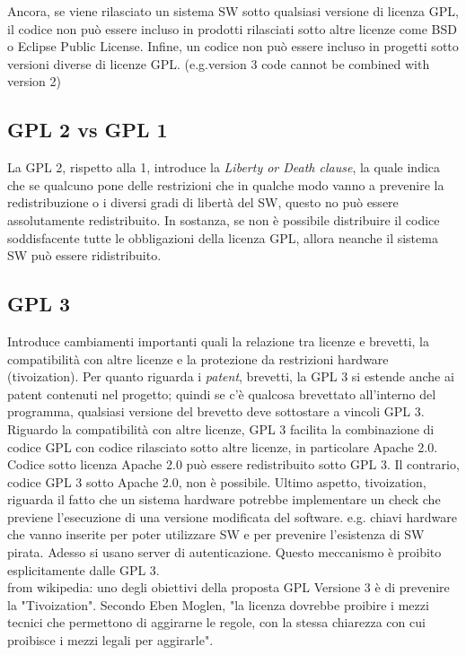\documentclass[10pt,a4paper]{book}
\begin{document}
Ancora, se viene rilasciato un sistema SW sotto qualsiasi versione di licenza GPL, il codice non può essere incluso in prodotti rilasciati sotto altre licenze come BSD o Eclipse Public License.
Infine, un codice non può essere incluso in progetti sotto versioni diverse di licenze GPL. (e.g.version 3 code cannot be combined with version 2)

\subsection{GPL 2 vs GPL 1}
La GPL 2, rispetto alla 1, introduce la \textit{Liberty or Death clause}, la quale indica che se qualcuno pone delle restrizioni che in qualche modo vanno a prevenire la redistribuzione o i diversi gradi di libertà del SW, questo no può essere assolutamente redistribuito.
In sostanza, se non è possibile distribuire il codice soddisfacente tutte le obbligazioni della licenza GPL, allora neanche il sistema SW può essere ridistribuito.

\subsection{GPL 3}
Introduce cambiamenti importanti quali la relazione tra licenze e brevetti, la compatibilità con altre licenze e la protezione da restrizioni hardware (tivoization).
Per quanto riguarda i \textit{patent}, brevetti, la GPL 3 si estende anche ai patent contenuti nel progetto; quindi se c'è qualcosa brevettato all'interno del programma, qualsiasi versione del brevetto deve sottostare a vincoli GPL 3.
Riguardo la compatibilità con altre licenze, GPL 3 facilita la combinazione di codice GPL con codice rilasciato sotto altre licenze, in particolare Apache 2.0. Codice sotto licenza Apache 2.0 può essere redistribuito sotto GPL 3. Il contrario, codice GPL 3 sotto Apache 2.0, non è possibile.
Ultimo aspetto, tivoization, riguarda il fatto che un sistema hardware potrebbe implementare un check che previene l'esecuzione di una versione modificata del software. e.g. chiavi hardware che vanno inserite per poter utilizzare SW e per prevenire l'esistenza di SW pirata. Adesso si usano server di autenticazione.
Questo meccanismo è proibito esplicitamente dalle GPL 3.\\
from wikipedia: uno degli obiettivi della proposta GPL Versione 3 è di prevenire la "Tivoization". Secondo Eben Moglen, "la licenza dovrebbe proibire i mezzi tecnici che permettono di aggirarne le regole, con la stessa chiarezza con cui proibisce i mezzi legali per aggirarle".
\end{document}
